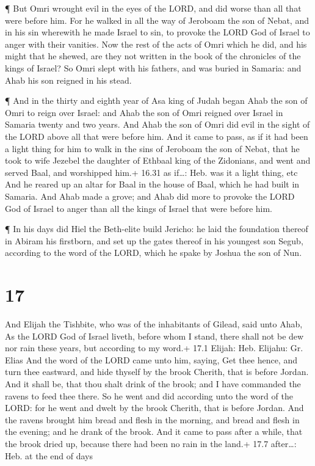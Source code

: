  ¶ But Omri wrought evil in the eyes of the LORD, and did
worse than all that were before him.  For he walked in all
the way of Jeroboam the son of Nebat, and in his sin wherewith he made
Israel to sin, to provoke the LORD God of Israel to anger with their
vanities.  Now the rest of the acts of Omri which he did,
and his might that he shewed, are they not written in the book of the
chronicles of the kings of Israel?  So Omri slept with his
fathers, and was buried in Samaria: and Ahab his son reigned in his
stead.

 ¶ And in the thirty and eighth year of Asa king of Judah
began Ahab the son of Omri to reign over Israel: and Ahab the son of
Omri reigned over Israel in Samaria twenty and two years. 
And Ahab the son of Omri did evil in the sight of the LORD above all
that were before him.  And it came to pass, as if it had
been a light thing for him to walk in the sins of Jeroboam the son of
Nebat, that he took to wife Jezebel the daughter of Ethbaal king of the
Zidonians, and went and served Baal, and worshipped him.+ 16.31 as
if\ldots: Heb. was it a light thing, etc  And he reared up
an altar for Baal in the house of Baal, which he had built in Samaria.
 And Ahab made a grove; and Ahab did more to provoke the
LORD God of Israel to anger than all the kings of Israel that were
before him.

 ¶ In his days did Hiel the Beth-elite build Jericho: he
laid the foundation thereof in Abiram his firstborn, and set up the
gates thereof in his youngest son Segub, according to the word of the
LORD, which he spake by Joshua the son of Nun.

\hypertarget{section-16}{%
\section{17}\label{section-16}}

 And Elijah the Tishbite, who was of the inhabitants of
Gilead, said unto Ahab, As the LORD God of Israel liveth, before whom I
stand, there shall not be dew nor rain these years, but according to my
word.+ 17.1 Elijah: Heb. Elijahu: Gr. Elias  And the word of
the LORD came unto him, saying,  Get thee hence, and turn
thee eastward, and hide thyself by the brook Cherith, that is before
Jordan.  And it shall be, that thou shalt drink of the
brook; and I have commanded the ravens to feed thee there. 
So he went and did according unto the word of the LORD: for he went and
dwelt by the brook Cherith, that is before Jordan.  And the
ravens brought him bread and flesh in the morning, and bread and flesh
in the evening; and he drank of the brook.  And it came to
pass after a while, that the brook dried up, because there had been no
rain in the land.+ 17.7 after\ldots: Heb. at the end of days

